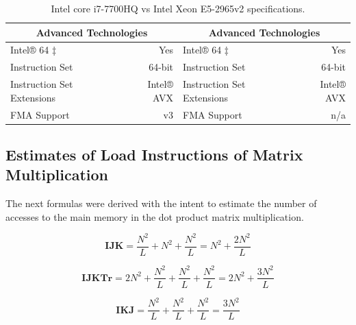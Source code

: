\documentclass[twoside,twocolumn]{article}
\begin{document}
\begin{appendices}
\begin{table}[ht]
{\begin{tabular}{|l|r|l|r|}
\multicolumn{2}{|c|}{\textbf{Advanced Technologies}}                                     & \multicolumn{2}{c|}{\textbf{Advanced Technologies}}                                       \\ \hline
Intel® 64 ‡                         & Yes                                                & Intel® 64 ‡                         & Yes                                                 \\ \hline
Instruction Set                     & 64-bit                                             & Instruction Set                     & 64-bit                                              \\ \hline
Instruction Set Extensions          & Intel® AVX                                         & Instruction Set Extensions          & Intel® AVX                                          \\ \hline
FMA Support                         & v3                                                 & FMA Support                         & n/a                                                 \\ \hline
\end{tabular}%
}
\caption{Intel core i7-7700HQ vs Intel Xeon E5-2965v2 specifications.}
\label{tab:comparison}
\end{table}

\subsection{Estimates of Load Instructions of Matrix Multiplication}
\label{ap:lformulas}

The next formulas were derived with the intent to estimate the number of accesses to the main memory in the dot product matrix multiplication.

\begin{equation} \label{eq:ijk}
\textbf{IJK} = \frac{N^{2}}{L} + N^{2} + \frac{N^{2}}{L} = N^{2} + \frac{2N^{2}}{L}
\end{equation}

\begin{equation} \label{eq:ijktr}
\textbf{IJKTr} = 2N^{2} + \frac{N^{2}}{L} + \frac{N^{2}}{L} + \frac{N^{2}}{L} = 2N^{2} + \frac{3N^{2}}{L}
\end{equation}

\begin{equation} \label{eq:ikj}
\textbf{IKJ} = \frac{N^{2}}{L} + \frac{N^{2}}{L} + \frac{N^{2}}{L} = \frac{3N^{2}}{L}
\end{equation}


\end{appendices}
\end{document}
